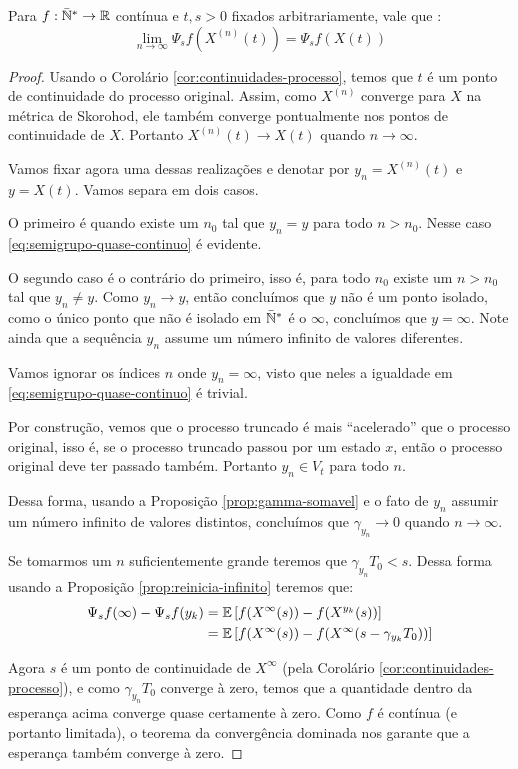 \begin{proposicao}
  \label{prop:semigrupo-quase-continuo}
  Para $f: {\mathbb{\bar{N}^*}} \to {\mathbb{R}}$ contínua e $t, s > 0$ fixados arbitrariamente,
  vale que \qc:
  \begin{equation}
    \label{eq:semigrupo-quase-continuo}
    \lim_{n \to \infty} \Psi_s f (X^{(n)}(t)) = \Psi_s f(X(t))
  \end{equation}
\end{proposicao}
\begin{proof}
  Usando o Corolário \ref{cor:continuidades-processo}, temos que $t$ é
  \qc um ponto de continuidade do processo original. Assim, como
  $X^{(n)}$ converge \qc para $X$ na métrica de Skorohod, ele também
  converge pontualmente nos pontos de continuidade de $X$. Portanto
  $X^{(n)}(t) \to X(t)$ \qc quando $n \to \infty$.

  Vamos fixar agora uma dessas realizações e denotar por $y_n =
  X^{(n)}(t)$ e $y = X(t)$. Vamos separa em dois casos.

  O primeiro é quando existe um $n_0$ tal que $y_n = y$ para todo $n >
  n_0$. Nesse caso \eqref{eq:semigrupo-quase-continuo} é evidente.

  O segundo caso é o contrário do primeiro, isso é, para todo $n_0$
  existe um $n > n_0$ tal que $y_n \neq y$. Como $y_n \to y$, então
  concluímos que $y$ não é um ponto isolado, como o único ponto que
  não é isolado em ${\mathbb{\bar{N}^*}}$ é o $\infty$, concluímos que $y = \infty$.
  Note ainda que a sequência $y_n$ assume um número infinito de
  valores diferentes.

  Vamos ignorar os índices $n$ onde $y_n = \infty$, visto que neles a
  igualdade em \eqref{eq:semigrupo-quase-continuo} é trivial. 

  Por construção, vemos que o processo truncado é mais ``acelerado''
  que o processo original, isso é, se o processo truncado passou por
  um estado $x$, então o processo original deve ter passado
  também. Portanto $y_n \in V_t$ para todo $n$.

  Dessa forma, usando a Proposição \ref{prop:gamma-somavel} e o fato
  de $y_n$ assumir um número infinito de valores distintos, concluímos
  que $\gamma_{y_n} \to 0$ quando $n \to \infty$.

  Se tomarmos um $n$ suficientemente grande teremos que $\gamma_{y_n}
  T_0 < s$. Dessa forma usando a Proposição
  \ref{prop:reinicia-infinito} teremos que:
  \begin{align*}
    \Psi_s f (\infty) - \Psi_s f (y_k) &=
    {\mathbb{E}}\left[ f(X^\infty(s)) - f(X^{y_k}(s)) \right] \\
    &= {\mathbb{E}}\left[ f(X^\infty(s)) -f (X^\infty(s - \gamma_{y_k}T_0)) \right] \\
  \end{align*}

  Agora $s$ é \qc um ponto de continuidade de $X^\infty$ (pela
  Corolário \ref{cor:continuidades-processo}), e como $\gamma_{y_n}
  T_0$ converge à zero, temos que a quantidade dentro da esperança
  acima converge quase certamente à zero. Como $f$ é contínua (e
  portanto limitada), o teorema da convergência dominada nos garante
  que a esperança também converge à zero.
\end{proof}


